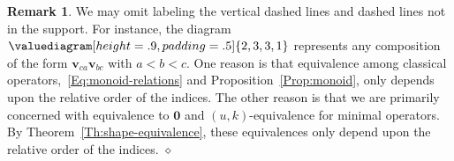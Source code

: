 \documentclass[12pt,oneside,reqno]{amsart}
\theoremstyle{definition}
\newtheorem{remark}[theorem]{Remark}
\numberwithin{equation}{section}
\newcommand{\qv}{{\mathbf v}}
\newcommand{\bzero}{{\mathbf 0}}
\newcommand{\ptsp}{\hspace{0.55pt}}
\newcommand{\pb}{\raisebox{-1pt}{\ptsp\color{magenta}\rule{0.75pt}{11pt}}\ptsp}  %
\begin{document}
\begin{remark}\label{Rem:relative-labels}
  We may omit labeling the vertical dashed lines and dashed lines not in the support.
  For instance, the diagram $\valuediagram[height=.9, padding=.5]{{2,3},{3,1}}$
  represents any composition of the form ${\qv}_{ca} {\qv}_{bc} $ with $a<b<c$.
%
%
%  
  One reason is that equivalence among classical operators,~\eqref{Eq:monoid-relations} and
  Proposition~\ref{Prop:monoid}, only depends upon the relative order of the indices.
  The other reason is that we are primarily concerned with equivalence to $\bzero$ and $(u,k)$-equivalence for minimal operators.
  By Theorem~\ref{Th:shape-equivalence}, these equivalences only depend upon the relative order of the indices.
 \hfill$\diamond$
\end{remark}
\end{document}
